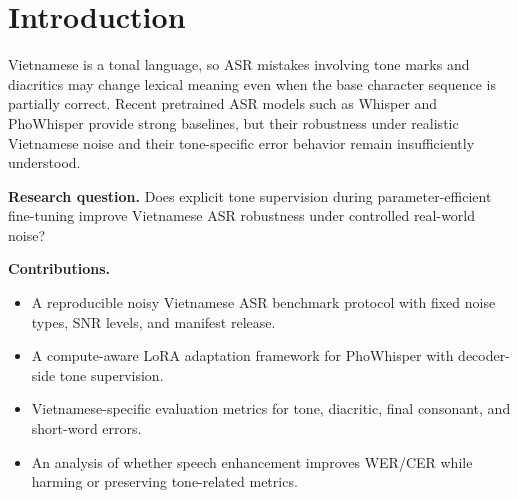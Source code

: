 \section{Introduction}
Vietnamese is a tonal language, so ASR mistakes involving tone marks and diacritics may change lexical meaning even when the base character sequence is partially correct. Recent pretrained ASR models such as Whisper and PhoWhisper provide strong baselines, but their robustness under realistic Vietnamese noise and their tone-specific error behavior remain insufficiently understood.

\textbf{Research question.} Does explicit tone supervision during parameter-efficient fine-tuning improve Vietnamese ASR robustness under controlled real-world noise?

\textbf{Contributions.}
\begin{itemize}
    \item A reproducible noisy Vietnamese ASR benchmark protocol with fixed noise types, SNR levels, and manifest release.
    \item A compute-aware LoRA adaptation framework for PhoWhisper with decoder-side tone supervision.
    \item Vietnamese-specific evaluation metrics for tone, diacritic, final consonant, and short-word errors.
    \item An analysis of whether speech enhancement improves WER/CER while harming or preserving tone-related metrics.
\end{itemize}
